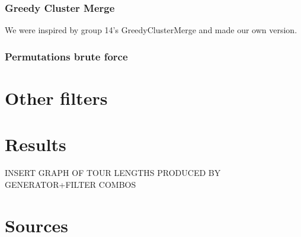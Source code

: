 \documentclass{article}
\begin{document}
\section*{Greedy Cluster Merge}%
We were inspired by group 14's GreedyClusterMerge and made our own version. %
\section*{Permutations brute force}%

\part*{Other filters}

\part*{Results}
INSERT GRAPH OF TOUR LENGTHS PRODUCED BY GENERATOR+FILTER COMBOS


\part*{Sources}
\end{document}
